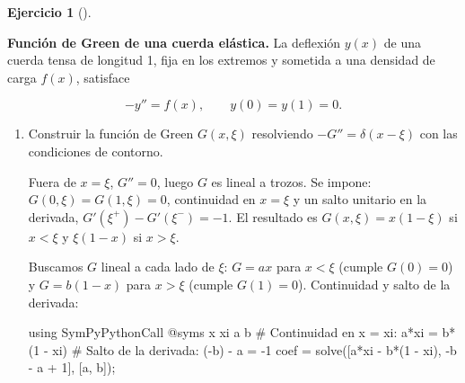 \documentclass[
  spanish,
  a4paper,
]{scrreport}
\newenvironment{Shaded}{\begin{snugshade}}{\end{snugshade}}
\newcommand{\BuiltInTok}[1]{\textcolor[rgb]{0.00,0.23,0.31}{#1}}
\newcommand{\CommentTok}[1]{\textcolor[rgb]{0.37,0.37,0.37}{#1}}
\newcommand{\FloatTok}[1]{\textcolor[rgb]{0.68,0.00,0.00}{#1}}
\newcommand{\FunctionTok}[1]{\textcolor[rgb]{0.28,0.35,0.67}{#1}}
\newcommand{\ImportTok}[1]{\textcolor[rgb]{0.00,0.46,0.62}{#1}}
\newcommand{\NormalTok}[1]{\textcolor[rgb]{0.00,0.23,0.31}{#1}}
\newcommand{\OperatorTok}[1]{\textcolor[rgb]{0.37,0.37,0.37}{#1}}
\newcommand{\PreprocessorTok}[1]{\textcolor[rgb]{0.68,0.00,0.00}{#1}}
\theoremstyle{definition}
\newtheorem{exercise}{Ejercicio}[chapter]
\theoremstyle{remark}
\begin{document}
\begin{exercise}[]\protect\hypertarget{exr-green-cuerda}{}\label{exr-green-cuerda}

\textbf{Función de Green de una cuerda elástica.} La deflexión \(y(x)\)
de una cuerda tensa de longitud 1, fija en los extremos y sometida a una
densidad de carga \(f(x)\), satisface

\[
-y'' = f(x), \qquad y(0) = y(1) = 0.
\]

\begin{enumerate}
\def\labelenumi{\alph{enumi}.}
\item
  Construir la función de Green \(G(x, \xi)\) resolviendo
  \(-G'' = \delta(x-\xi)\) con las condiciones de contorno.

  \begin{tcolorbox}[enhanced jigsaw, arc=.35mm, bottomrule=.15mm, bottomtitle=1mm, breakable, colback=white, colbacktitle=quarto-callout-note-color!10!white, colframe=quarto-callout-note-color-frame, coltitle=black, left=2mm, leftrule=.75mm, opacityback=0, opacitybacktitle=0.6, rightrule=.15mm, title=\textcolor{quarto-callout-note-color}{\faInfo}\hspace{0.5em}{Ayuda}, titlerule=0mm, toprule=.15mm, toptitle=1mm]

  Fuera de \(x = \xi\), \(G'' = 0\), luego \(G\) es lineal a trozos. Se
  impone: \(G(0,\xi)=G(1,\xi)=0\), continuidad en \(x=\xi\) y un salto
  unitario en la derivada, \(G'(\xi^+) - G'(\xi^-) = -1\). El resultado
  es \(G(x,\xi) = x(1-\xi)\) si \(x<\xi\) y \(\xi(1-x)\) si \(x>\xi\).

  \end{tcolorbox}

  \begin{tcolorbox}[enhanced jigsaw, arc=.35mm, bottomrule=.15mm, bottomtitle=1mm, breakable, colback=white, colbacktitle=quarto-callout-tip-color!10!white, colframe=quarto-callout-tip-color-frame, coltitle=black, left=2mm, leftrule=.75mm, opacityback=0, opacitybacktitle=0.6, rightrule=.15mm, title=\textcolor{quarto-callout-tip-color}{\faLightbulb}\hspace{0.5em}{Solución}, titlerule=0mm, toprule=.15mm, toptitle=1mm]

  Buscamos \(G\) lineal a cada lado de \(\xi\): \(G = a x\) para
  \(x<\xi\) (cumple \(G(0)=0\)) y \(G = b(1-x)\) para \(x>\xi\) (cumple
  \(G(1)=0\)). Continuidad y salto de la derivada:

\begin{Shaded}
\begin{Highlighting}[]
\ImportTok{using} \BuiltInTok{SymPyPythonCall}
\PreprocessorTok{@syms}\NormalTok{ x xi a b}
\CommentTok{\# Continuidad en x = xi:  a*xi = b*(1 {-} xi)}
\CommentTok{\# Salto de la derivada:   ({-}b) {-} a = {-}1}
\NormalTok{coef }\OperatorTok{=} \FunctionTok{solve}\NormalTok{([a}\OperatorTok{*}\NormalTok{xi }\OperatorTok{{-}} \FunctionTok{b*}\NormalTok{(}\FloatTok{1} \OperatorTok{{-}}\NormalTok{ xi), }\OperatorTok{{-}}\NormalTok{b }\OperatorTok{{-}}\NormalTok{ a }\OperatorTok{+} \FloatTok{1}\NormalTok{], [a, b]);}
\end{Highlighting}
\end{Shaded}


\end{tcolorbox}
\end{enumerate}
\end{exercise}
\end{document}
